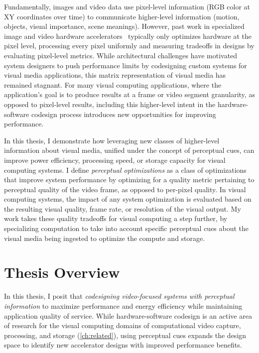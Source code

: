 Fundamentally, images and video data use pixel-level information (RGB color at XY coordinates over time) to communicate higher-level information (motion, objects, visual importance, scene meanings).
However, past work in specialized image and video hardware accelerators~\cite{hauswald2014hybrid, convolution_engine, adams2010frankencamera} typically only optimizes hardware at the pixel level, processing every pixel uniformly and measuring tradeoffs in designs by evaluating pixel-level metrics.
While architectural challenges have motivated system designers to push performance limits by codesigning custom systems for visual media applications, this matrix representation of visual media has remained stagnant.
For many visual computing applications, where the application's goal is to produce results at a frame or video segment granularity, as opposed to pixel-level results, including this higher-level intent in the hardware-software codesign process introduces new opportunities for improving performance.

In this thesis, I demonstrate how leveraging new classes of higher-level information about visual media, unified under the concept of perceptual cues, can improve power efficiency, processing speed, or storage capacity for visual computing systems.
I define \textit{perceptual optimizations} as a class of optimizations that improve system performance by optimizing for a quality metric pertaining to perceptual quality of the video frame, as opposed to per-pixel quality.
In visual computing systems, the impact of any system optimization is evaluated based on the resulting visual quality, frame rate, or resolution of the visual output.
My work takes these quality tradeoffs for visual computing a step further, by specializing computation to take into account specific perceptual cues about the visual media being ingested to optimize the compute and storage.

\section{Thesis Overview}
In this thesis, I posit that \emph{codesigning video-focused systems with perceptual information} to maximize performance and energy efficiency while maintaining application quality of service.
While hardware-software codesign is an active area of research for the visual computing domains of computational video capture, processing, and storage (\ref{ch:related}), using perceptual cues expands the design space to identify new accelerator designs with improved performance benefits.

